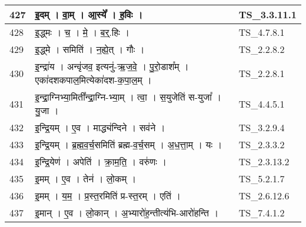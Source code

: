\documentclass[17pt]{extarticle}
\begin{document}
\begin{longtable}{||p{0.4in}||p{4.9in}||p{0.9in}||}
    \hline
        
    427 & इ॒दम्   ।   वा॒म्   ।   आ॒स्ये᳚   ।   ह॒विः   ।    & TS\_3.3.11.1       \\
    
    \hline
        
    428 & इ॒द्ध्मः   ।   च॒   ।   मे॒   ।   ब॒र्॒.हिः   ।    & TS\_4.7.8.1       \\
    
    \hline
        
    429 & इ॒द्ध्मे   ।   समिति॑   ।   न॒ह्ये॒त्   ।   गौः   ।    & TS\_2.2.8.2       \\
    
    \hline
        
    430 & इ॒न्द्रा॑य   ।   अन्वृ॑जव॒ इत्यनु॑{-}ऋ॒ज॒वे॒   ।   पु॒रो॒डाश᳚म्   ।   एका॑दशकपाल॒मित्येका॑दश{-}क॒पा॒ल॒म्   ।    & TS\_2.2.8.1       \\
    
    \hline
        
    431 & इ॒न्द्रा॒ग्निभ्या॒मिती᳚न्द्रा॒ग्नि{-}भ्या॒म्   ।   त्वा॒   ।   स॒युजेति॑ स{-}युजा᳚   ।   यु॒जा   ।    & TS\_4.4.5.1       \\
    
    \hline
        
    432 & इ॒न्द्रि॒यम्   ।   ए॒व   ।   माद्ध्य॑न्दिने   ।   सव॑ने   ।    & TS\_3.2.9.4       \\
    
    \hline
        
    433 & इ॒न्द्रि॒यम्   ।   ब्र॒ह्म॒व॒र्च॒समिति॑ ब्रह्म{-}व॒र्च॒सम्   ।   अ॒ध॒त्ता॒म्   ।   यः   ।    & TS\_2.3.3.2       \\
    
    \hline
        
    434 & इ॒न्द्रि॒येण॑   ।   अपेति॑   ।   क्रा॒म॒ति॒   ।   वरु॑णः   ।    & TS\_2.3.13.2       \\
    
    \hline
        
    435 & इ॒मम्   ।   ए॒व   ।   तेन॑   ।   लो॒कम्   ।    & TS\_5.2.1.7       \\
    
    \hline
        
    436 & इ॒मम्   ।   य॒म॒   ।   प्र॒स्त॒रमिति॑ प्र{-}स्त॒रम्   ।   एति॑   ।    & TS\_2.6.12.6       \\
    
    \hline
        
    437 & इ॒मान्   ।   ए॒व   ।   लो॒कान्   ।   अ॒भ्यारो॑ह॒न्तीत्य॑भि{-}आरो॑हन्ति   ।    & TS\_7.4.1.2       \\
    

\end{longtable}
\end{document}
